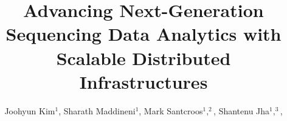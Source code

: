 \documentclass{cpeauth}
\begin{document}


\def\cop{Copyright \copyright\ 2000 John Wiley \&\ Sons, Ltd.}



\newif\ifdraft

\ifdraft
 \newcommand{\jkimnote}[1]{{\textcolor{green}   { ***Joohyun:   #1 }}}
 \newcommand{\jhanote}[1]{  {\textcolor{red}     { ***SJ: #1 }}}
  \newcommand{\smnote}[1]{  {\textcolor{red}     { ***Sharath: #1 }}}
  \newcommand{\msnote}[1]{  {\textcolor{blue}     { ***Mark: #1 }}}

 \newcommand{\todo}[1]{  {\textcolor{red}     { ***TODO: #1 }}}
 \newcommand{\fix}[1]{  {\textcolor{red}     { ***FIX: #1 }}}
 \newcommand{\reviewer}[1]{}
\else
 \newcommand{\reviewer}[1]{}
 \newcommand{\jkimnote}[1]{}
 \newcommand{\smnote}[1]{}
 \newcommand{\jhanote}[1]{}
 \newcommand{\todo}[1]{  {\textcolor{red}     { ***TODO: #1 }}}
 \newcommand{\fix}[1]{}                                                                                     
\fi


\title{Advancing Next-Generation Sequencing Data Analytics with Scalable Distributed Infrastructures}


\author{
Joohyun Kim\ensuremath{^1}\comma\footnotemark[2], 
Sharath Maddineni\ensuremath{^1},
Mark Santcroos\ensuremath{^1,^2},
Shantenu Jha\corrauth\ensuremath{^1,^3}\comma\footnotemark[3],
}


\date{}

\received{}
\revised{}
\noaccepted{}
\end{document}
